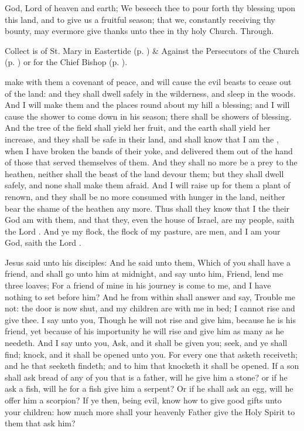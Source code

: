 \collect
{} God, Lord of heaven and earth; We beseech thee to pour forth thy blessing upon this land, and to give us a fruitful season; that we, constantly receiving thy bounty, may evermore give thanks unto thee in thy holy Church. Through.
\begin{rubric}
     Collect is of St. Mary in Eastertide (p. \pageref{SPMaryInEaster}) \&  Against the Persecutors of the Church (p. \pageref{SPAgainst}) or for the Chief Bishop (p. \pageref{SPChiefBishop}).
\end{rubric}
 make with them a covenant of peace, and will cause the evil beasts to cease out of the land: and they shall dwell safely in the wilderness, and sleep in the woods. And I will make them and the places round about my hill a blessing; and I will cause the shower to come down in his season; there shall be showers of blessing. And the tree of the field shall yield her fruit, and the earth shall yield her increase, and they shall be safe in their land, and shall know that I am the , when I have broken the bands of their yoke, and delivered them out of the hand of those that served themselves of them. And they shall no more be a prey to the heathen, neither shall the beast of the land devour them; but they shall dwell safely, and none shall make them afraid. And I will raise up for them a plant of renown, and they shall be no more consumed with hunger in the land, neither bear the shame of the heathen any more. Thus shall they know that I the  their God am with them, and that they, even the house of Israel, are my people, saith the Lord . And ye my flock, the flock of my pasture, are men, and I am your God, saith the Lord .


 Jesus said unto his disciples: And he said unto them, Which of you shall have a friend, and shall go unto him at midnight, and say unto him, Friend, lend me three loaves; For a friend of mine in his journey is come to me, and I have nothing to set before him? And he from within shall answer and say, Trouble me not: the door is now shut, and my children are with me in bed; I cannot rise and give thee. I say unto you, Though he will not rise and give him, because he is his friend, yet because of his importunity he will rise and give him as many as he needeth. And I say unto you, Ask, and it shall be given you; seek, and ye shall find; knock, and it shall be opened unto you. For every one that asketh receiveth; and he that seeketh findeth; and to him that knocketh it shall be opened. If a son shall ask bread of any of you that is a father, will he give him a stone? or if he ask a fish, will he for a fish give him a serpent? Or if he shall ask an egg, will he offer him a scorpion? If ye then, being evil, know how to give good gifts unto your children: how much more shall your heavenly Father give the Holy Spirit to them that ask him?

